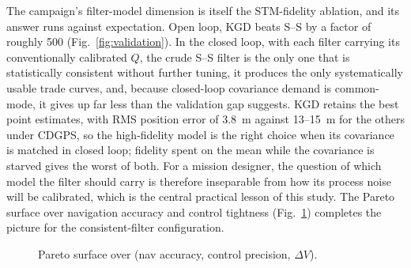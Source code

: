The campaign's filter-model dimension is itself the STM-fidelity ablation,
and its answer runs against expectation. Open loop, KGD beats S--S by a
factor of roughly 500 (Fig.~\ref{fig:validation}). In the closed loop, with
each filter carrying its conventionally calibrated $Q$, the crude S--S
filter is the only one that is statistically consistent without further
tuning, it produces the only systematically usable trade curves, and,
because closed-loop covariance demand is common-mode, it gives up far less
than the validation gap suggests. KGD retains the best point estimates, with
RMS position error of 3.8~m against 13--15~m for the others under CDGPS, so
the high-fidelity model is the right choice when its covariance is matched
in closed loop; fidelity spent on the mean while the covariance is starved
gives the worst of both. For a mission designer, the question of which model
the filter should carry is therefore inseparable from how its process noise
will be calibrated, which is the central practical lesson of this study. The
Pareto surface over navigation accuracy and control tightness
(Fig.~\ref{fig:surface}) completes the picture for the consistent-filter
configuration.

\begin{figure}[t]
  \centering
  \caption{Pareto surface over (nav accuracy, control precision,
  $\Delta V$).}
  \label{fig:surface}
\end{figure}
